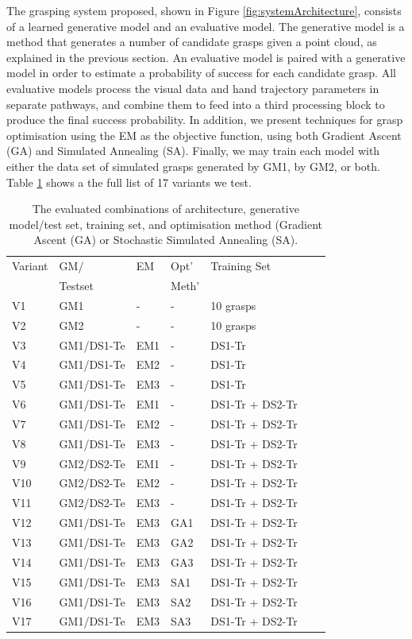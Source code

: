\noindent
The grasping system proposed, shown in Figure \ref{fig:systemArchitecture}, consists of a learned generative model and an evaluative model. The generative model is a method that generates a number of candidate grasps given a point cloud, as explained in the previous section. An evaluative model is paired with a generative model in order to estimate a probability of success for each candidate grasp. All evaluative models process the visual data and hand trajectory parameters in separate pathways, and combine them to feed into a third processing block to produce the final success probability. In addition, we present techniques for grasp optimisation using the EM as the objective function, using both Gradient Ascent (GA) and Simulated Annealing (SA). Finally, we may train each model with either the data set of simulated grasps generated by GM1, by GM2, or both. Table \ref{table:GEBreakdown} shows a the full list of 17 variants we test.

\begin{table}[]
\centering
\begin{tabular}{|l|l|l|l|l|l|l|}
\hline
Variant & GM/  & EM & Opt'  & Training Set \\ 
 & Testset & & Meth' & \\ \hline
V1 & GM1    & - & - & 10 grasps  \\ \hline
V2 & GM2    & - & - & 10 grasps  \\ \hline
V3 & GM1/DS1-Te & EM1 & - & DS1-Tr \\ \hline
V4 & GM1/DS1-Te & EM2 & - & DS1-Tr \\ \hline
V5 & GM1/DS1-Te & EM3 & - & DS1-Tr  \\ \hline
V6 & GM1/DS1-Te & EM1 & - & DS1-Tr + DS2-Tr \\ \hline
V7 & GM1/DS1-Te & EM2 & - & DS1-Tr + DS2-Tr \\ \hline
V8 & GM1/DS1-Te & EM3 & - & DS1-Tr + DS2-Tr \\ \hline
V9 & GM2/DS2-Te & EM1 & - & DS1-Tr + DS2-Tr \\ \hline
V10 & GM2/DS2-Te & EM2 & - & DS1-Tr + DS2-Tr \\ \hline
V11 & GM2/DS2-Te & EM3 & - & DS1-Tr + DS2-Tr \\ \hline
V12 & GM1/DS1-Te & EM3 & GA1 & DS1-Tr + DS2-Tr \\ \hline
V13 & GM1/DS1-Te & EM3 & GA2 & DS1-Tr + DS2-Tr \\ \hline
V14 & GM1/DS1-Te & EM3 & GA3 & DS1-Tr + DS2-Tr \\ \hline
V15 & GM1/DS1-Te & EM3 & SA1 & DS1-Tr + DS2-Tr \\ \hline
V16 & GM1/DS1-Te & EM3 & SA2 & DS1-Tr + DS2-Tr \\ \hline
V17 & GM1/DS1-Te & EM3 & SA3 & DS1-Tr + DS2-Tr \\ \hline
\end{tabular}
\caption{The evaluated combinations of architecture, generative model/test set, training set, and optimisation method (Gradient Ascent (GA) or Stochastic Simulated Annealing (SA).}
\label{table:GEBreakdown}
\end{table}

